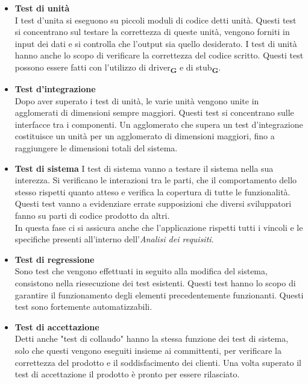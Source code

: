 \begin{itemize}
    \item \textbf{Test di unità}\\
          I test d'unita si eseguono su piccoli moduli di codice detti unità. Questi test si concentrano sul testare la correttezza di queste unità, vengono forniti in input dei dati e si controlla che l'output sia quello desiderato. I test di unità hanno anche lo scopo di verificare la correttezza del codice scritto. Questi test possono essere fatti con l'utilizzo di driver\textsubscript{\textbf{G}} e di stub\textsubscript{\textbf{G}}.
    \item \textbf{Test d'integrazione}\\
          Dopo aver superato i test di unità, le varie unità vengono unite in agglomerati di dimensioni sempre maggiori. Questi test si concentrano sulle interfacce tra i componenti. Un agglomerato che supera un test d'integrazione costituisce un unità per un agglomerato di dimensioni maggiori, fino a raggiungere le dimensioni totali del sistema.
    \item \textbf{Test di sistema}
          I test di sistema vanno a testare il sistema nella sua interezza. Si verificano le interazioni tra le parti, che il comportamento dello stesso rispetti quanto atteso e verifica la copertura di tutte le funzionalità. Questi test vanno a evidenziare errate supposizioni che diversi sviluppatori fanno su parti di codice prodotto da altri.\\
          In questa fase ci si assicura anche che l'applicazione rispetti tutti i vincoli e le specifiche presenti all'interno dell'\textit{Analisi dei requisiti}.
    \item \textbf{Test di regressione}\\
          Sono test che vengono effettuati in seguito alla modifica del sistema, consistono nella riesecuzione dei test esistenti. Questi test hanno lo scopo di garantire il funzionamento degli elementi precedentemente funzionanti. Questi test sono fortemente automatizzabili.
    \item \textbf{Test di accettazione}\\
          Detti anche "test di collaudo" hanno la stessa funzione dei test di sistema, solo che questi vengono eseguiti insieme ai committenti, per verificare la correttezza del prodotto e il soddisfacimento dei clienti. Una volta superato il test di accettazione il prodotto è pronto per essere rilasciato.

\end{itemize}
